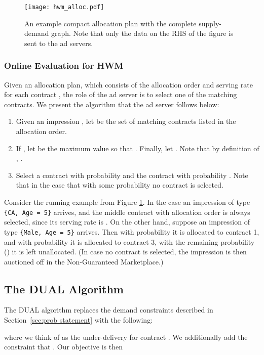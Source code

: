 \begin{figure}[t]
\centering
\texttt{[image: hwm\_alloc.pdf]}
\caption{An example compact allocation plan with the complete supply-demand graph. Note that only the data on the RHS of the figure is sent to the ad servers.}
\label{fig:plan}
\end{figure}

\subsubsection{Online Evaluation for HWM} \label{sec:online} Given an
allocation plan, which consists of the allocation order and serving
rate  for each contract , the role of the ad server is
to select one of the matching contracts. We present the algorithm
that the ad server follows below:
\begin{enumerate}\itemsep=0in
\item Given an impression , let  be the set of matching contracts listed in the allocation order.
\item If , let  be the maximum value so that . Finally, let . Note that by definition of , .
\item Select a contract  with probability  and the contract  with probability . Note that in the case that  with some probability no contract is selected.
\end{enumerate}

Consider the running example from Figure \ref{fig:plan}.
In the case an impression of type \texttt{\{CA, Age = 5\}} arrives, 
and the middle contract with allocation order  is always selected, since its serving rate is .
On the other hand, suppose an impression of type \texttt{\{Male, Age = 5\}} arrives.  Then with probability  it is allocated to contract 1, and with probability  it is allocated to contract 3, with the remaining probability () it is left unallocated.
(In case no contract is selected, the impression is then auctioned off in the Non-Guaranteed Marketplace.)

\subsection{The DUAL Algorithm}
The DUAL algorithm replaces the demand constraints described in
Section~\ref{sec:prob statement} with the following:

where we think of  as the under-delivery for contract .  We
additionally add the constraint that .  Our objective is
then

